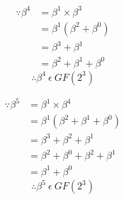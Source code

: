         \begin{minipage}[t]{0.5\textwidth}
            \begin{equation*}
                \begin{split}
                    \because \beta^{4} & = \beta^{1} \times \beta^{3} \\
                    & = \beta^{1} (\beta^{2}+\beta^{0}) \\
                    & = \beta^{3}+\beta^{1} \\
                    & = \beta^{2}+\beta^{1}+\beta^{0}
                \end{split}
            \end{equation*}
            \[ \therefore \beta^{4} \ \epsilon \ GF(2^{3}) \]
        \end{minipage}
        \begin{minipage}[t]{0.5\textwidth}
            \begin{equation*}
                \begin{split}
                    \because \beta^{5} & = \beta^{1} \times \beta^{4} \\
                    & = \beta^{1} (\beta^{2}+\beta^{1}+\beta^{0}) \\
                    & = \beta^{3}+\beta^{2}+\beta^{1} \\
                    & = \beta^{2}+\beta^{0}+\beta^{2}+\beta^{1} \\
                    & = \beta^{1}+\beta^{0}
                \end{split}
            \end{equation*}
            \[ \therefore \beta^{5} \ \epsilon \ GF(2^{3}) \]
        \end{minipage}

